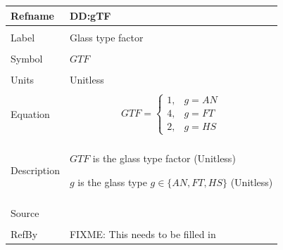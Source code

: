 \documentclass[12pt]{article}
\begin{document}
\noindent \begin{minipage}{\textwidth}
\begin{tabular}{p{} p{}}
\toprule \textbf{Refname} & \textbf{DD:gTF}
\label{DD:gTF}
\\ \midrule \\
Label & Glass type factor
\\ \midrule \\
Symbol & $GTF$
\\ \midrule \\
Units & Unitless
\\ \midrule \\
Equation & \begin{dmath}
           GTF=\begin{cases}
1, & g=AN\\
4, & g=FT\\
2, & g=HS
\end{cases}
           \end{dmath}
\\ \midrule \\
Description & \begin{description}
              \item{$GTF$ is the glass type factor (Unitless)}
              \item{$g$ is the glass type $g\in{}\{AN,FT,HS\}$ (Unitless)}
              \end{description}
\\ \midrule \\
Source & 
\\ \midrule \\
RefBy & FIXME: This needs to be filled in
\\ \bottomrule \end{tabular}
\end{minipage}\\
~\newline
\end{document}
